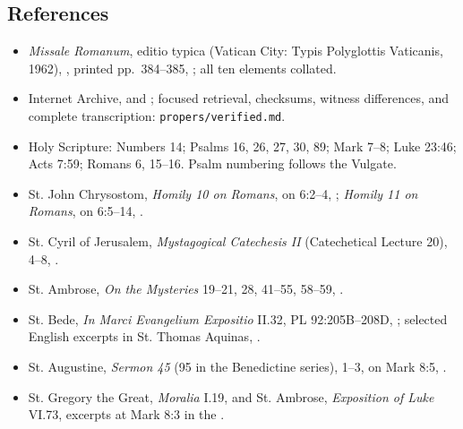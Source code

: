 \begin{deepstudy}
\section*{References}
{\footnotesize
\begin{itemize}[itemsep=0em,topsep=0.15em,parsep=0pt]
\item \emph{Missale Romanum}, editio typica (Vatican City: Typis Polyglottis Vaticanis, 1962), , printed pp.~384--385, ; all ten elements collated.
\item Internet Archive,  and ; focused retrieval, checksums, witness differences, and complete transcription: \nolinkurl{propers/verified.md}.
\item Holy Scripture: Numbers 14; Psalms 16, 26, 27, 30, 89; Mark 7--8; Luke 23:46; Acts 7:59; Romans 6, 15--16. Psalm numbering follows the Vulgate.
\item St. John Chrysostom, \emph{Homily 10 on Romans}, on 6:2--4, ; \emph{Homily 11 on Romans}, on 6:5--14, .
\item St. Cyril of Jerusalem, \emph{Mystagogical Catechesis II} (Catechetical Lecture 20), 4--8, .
\item St. Ambrose, \emph{On the Mysteries} 19--21, 28, 41--55, 58--59, .
\item St. Bede, \emph{In Marci Evangelium Expositio} II.32, PL 92:205B--208D, ; selected English excerpts in St. Thomas Aquinas, .
\item St. Augustine, \emph{Sermon 45} (95 in the Benedictine series), 1--3, on Mark 8:5, .
\item St. Gregory the Great, \emph{Moralia} I.19, and St. Ambrose, \emph{Exposition of Luke} VI.73, excerpts at Mark 8:3 in the .

\end{itemize}}
\end{deepstudy}
